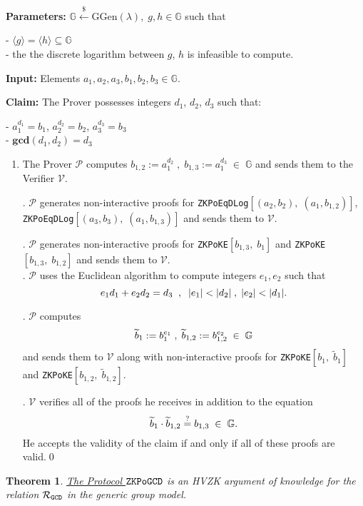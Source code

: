 \documentclass[11pt, lettersize, notitlepage, leqno, footskip=0.6cm]{article}
\newcommand{\bG}{\mathbb{G}}
\newcommand{\la}{\langle}
\newcommand{\ra}{\rangle}
\newcommand{\wti}{\widetilde}
\newcommand{\mc}{\mathcal}
\newcommand{\mb}{\mathbb}
\newcommand{\mbf}{\mathbf}
\newcommand{\mr}{\mathrm}
\newcommand{\lamb}{\lambda}
\newcommand{\sub}{\subseteq}
\newcommand{\mP}{\mc{P}}
\newcommand{\V}{\mc{V}}
\newcommand{\vs}{\vspace{-0.15cm}}
\newcommand{\noin}{\noindent}
\newcommand{\GCD}{\mbf{gcd}}
\newtheorem{Thm}{Theorem}[section]
\numberwithin{equation}{section}
\begin{document}
\noin \textbf{Parameters:} $\mb{G}\xleftarrow{\$} \mr{GGen}(\lamb), \; g, h\in \mb{G}$ such that

\noin - $\la g \ra = \la h \ra\sub \bG$ \\
\noin - the the discrete logarithm between $g$, $h$ is infeasible to compute.

\noin \textbf{Input:} Elements $a_1, a_2, a_3, b_1, b_2, b_3 \in \mb{G}$.

\noin \textbf{Claim:} The Prover possesses integers $d_1$, $d_2$, $d_3$ such that:

\noin - $a_1^{d_1} = b_1$, $a_2^{d_2} = b_2$, $a_3^{d_3} = b_3$\\
\noin - $\GCD(d_1, d_2) = d_3$
 

\begin{enumerate}[wide, labelwidth=!, labelindent=0pt]\vs \item The Prover $\mc{P}$ computes $b_{1,2}:= a_1^{d_2}\;,\; b_{1,3}:= a_1^{d_3}\;\in\;\bG$ and sends them to the Verifier $\V$.

\noin 2. $\mP$ generates non-interactive proofs for \verb|ZKPoEqDLog|$[(a_2, b_2),\; (a_1, b_{1,2})]$, \verb|ZKPoEqDLog|$[(a_3, b_3),\; (a_1, b_{1,3})]$ and sends them to $\mc{V}$.

\noin 3. $\mc{P}$ generates non-interactive proofs for \verb|ZKPoKE|$[b_{1,3},\;b_1 ]$ and \verb|ZKPoKE|$[b_{1,3},\;b_{1,2} ]$ and sends them to $\V$.\\
\noin 3. $\mc{P}$ uses the Euclidean algorithm to compute integers $e_1, e_2$ such that \vs $$e_1d_1 + e_2d_2 = d_3\;\;,\;\; |e_1| < |d_2|\;,\; |e_2| < |d_1|. \vs $$

\noin 5. $\mc{P}$ computes $$\wti{b}_1:= b_1^{e_1}\;,\; \wti{b}_{1,2}:= b_{1,2}^{e_2}\;\in\;\bG \vs $$ and sends them to $\V$ along with non-interactive proofs for \verb|ZKPoKE|$[b_1,\; \wti{b}_1]$ and \verb|ZKPoKE|$[b_{1,2},\; \wti{b}_{1,2}]$.

\noin 6. $\mc{V}$ verifies all of the proofs he receives in addition to the equation \vs $$\wti{b}_1\cdot \wti{b}_{1,2}\stackrel{?}{=} b_{1,3}\;\in\;\bG. \vs $$ He accepts the validity of the claim if and only if all of these proofs are valid.\qed \end{enumerate}



\begin{Thm}\label{GCDProof} \hyperlink{GCD}{The Protocol $\tt{ZKPoGCD}$} is an HVZK argument of knowledge for the relation $\mc{R}_{{\tt{GCD}}}$ in the generic group model.\end{Thm}
\end{document}
